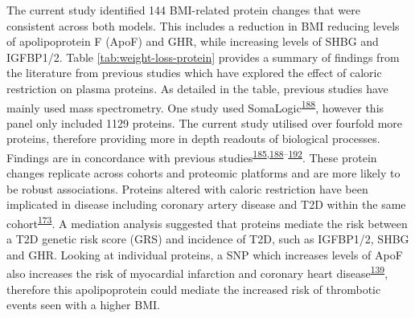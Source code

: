 \documentclass[11pt,twoside]{bristolthesis}
\begin{document}
The current study identified 144 BMI-related protein changes that were consistent across both models. This includes a reduction in BMI reducing levels of apolipoprotein F (ApoF) and GHR, while increasing levels of SHBG and IGFBP1/2. Table \ref{tab:weight-loss-protein} provides a summary of findings from the literature from previous studies which have explored the effect of caloric restriction on plasma proteins. As detailed in the table, previous studies have mainly used mass spectrometry. One study used SomaLogic\textsuperscript{\protect\hyperlink{ref-Carayol2017}{188}}, however this panel only included 1129 proteins. The current study utilised over fourfold more proteins, therefore providing more in depth readouts of biological processes. Findings are in concordance with previous studies\textsuperscript{\protect\hyperlink{ref-Figarska2020}{185},\protect\hyperlink{ref-Carayol2017}{188}--\protect\hyperlink{ref-Bruderer2019}{192}}. These protein changes replicate across cohorts and proteomic platforms and are more likely to be robust associations. Proteins altered with caloric restriction have been implicated in disease including coronary artery disease and T2D within the same cohort\textsuperscript{\protect\hyperlink{ref-Ritchie2019}{173}}. A mediation analysis suggested that proteins mediate the risk between a T2D genetic risk score (GRS) and incidence of T2D, such as IGFBP1/2, SHBG and GHR. Looking at individual proteins, a SNP which increases levels of ApoF also increases the risk of myocardial infarction and coronary heart disease\textsuperscript{\protect\hyperlink{ref-Liu2021}{139}}, therefore this apolipoprotein could mediate the increased risk of thrombotic events seen with a higher BMI.
\end{document}

